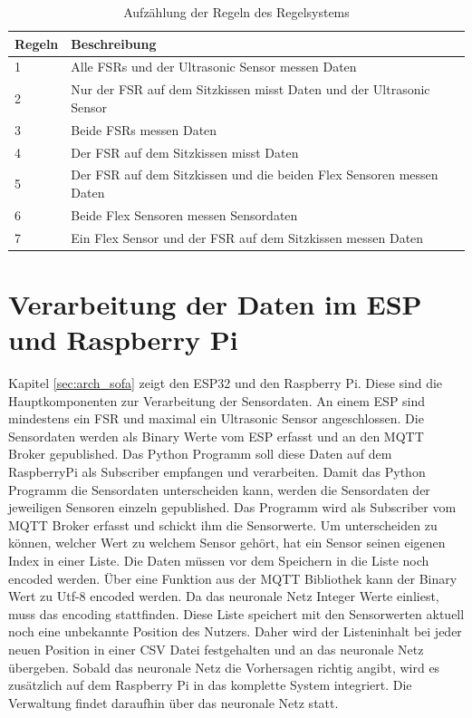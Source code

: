\begin{table}[H]
	\centering
	\caption[Aufzählung der Regeln des Regelsystems]{Aufzählung der Regeln des Regelsystems}
		\vspace{1.0em}	
	\begin{tabular}{|l|p{7cm}|}
		\hline
		\rowcolor[gray]{0.9}\textbf{Regeln} & \textbf{Beschreibung} \\
		\hline
		\hline
		1 & Alle FSRs und der Ultrasonic Sensor messen Daten \\
		\hline
		2 & Nur der FSR auf dem Sitzkissen misst Daten
		    und der Ultrasonic Sensor \\
		\hline
		3 & Beide FSRs messen Daten \\
		\hline
		4 & Der FSR auf dem Sitzkissen misst Daten \\
		\hline
		5 & Der FSR auf dem Sitzkissen und die beiden Flex Sensoren messen Daten \\
		\hline
		6 & Beide Flex Sensoren messen Sensordaten \\
		\hline
		7 & Ein Flex Sensor und der FSR auf dem Sitzkissen messen Daten \\
		\hline
	\end{tabular}
	\label{tab:tablerules}
\end{table}

\section{Verarbeitung der Daten im ESP und Raspberry Pi}
Kapitel \ref{sec:arch_sofa} zeigt den ESP32 und den Raspberry Pi. Diese sind die Hauptkomponenten zur Verarbeitung der Sensordaten. An einem ESP sind mindestens ein FSR und maximal ein Ultrasonic Sensor angeschlossen. Die Sensordaten werden als Binary Werte vom ESP erfasst und an den MQTT Broker gepublished. Das Python Programm soll diese Daten auf dem RaspberryPi als Subscriber empfangen und verarbeiten. Damit das Python Programm die Sensordaten unterscheiden kann, werden die Sensordaten der jeweiligen Sensoren einzeln gepublished. Das Programm wird als Subscriber vom MQTT Broker erfasst und schickt ihm die Sensorwerte. Um unterscheiden zu können, welcher Wert zu welchem Sensor gehört, hat ein Sensor seinen eigenen Index in einer Liste. Die Daten müssen vor dem Speichern in die Liste noch encoded werden. Über eine Funktion aus der MQTT Bibliothek kann der Binary Wert zu Utf-8 encoded werden. Da das neuronale Netz Integer Werte einliest, muss das encoding stattfinden. Diese Liste speichert mit den Sensorwerten aktuell noch eine unbekannte Position des Nutzers. Daher wird der Listeninhalt bei jeder neuen Position in einer CSV Datei festgehalten und an das neuronale Netz übergeben.
\newline
Sobald das neuronale Netz die Vorhersagen richtig angibt, wird es zusätzlich auf dem Raspberry Pi in das komplette System integriert. Die Verwaltung findet daraufhin über das neuronale Netz statt.

